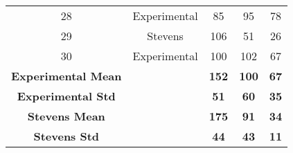 \begin{table}[!ht]
{\begin{tabular}{ccccc}
28 & Experimental & 85  & 95  & 78  \\
29 & Stevens      & 106 & 51  & 26  \\
30 & Experimental & 100 & 102 & 67  \\
\midrule
\textbf{Experimental Mean} &  & \textbf{152} & \textbf{100} & \textbf{67} \\
\textbf{Experimental Std}  &  & \textbf{51}  & \textbf{60}  & \textbf{35} \\
\textbf{Stevens Mean}      &  & \textbf{175} & \textbf{91}  & \textbf{34} \\
\textbf{Stevens Std}       &  & \textbf{44}  & \textbf{43}  & \textbf{11} \\
\bottomrule
\end{tabular}}
\end{table}
